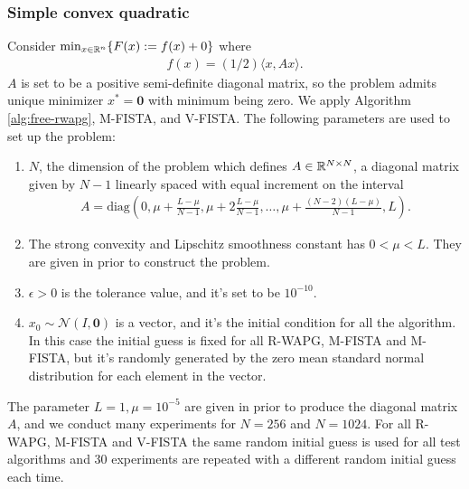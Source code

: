 \documentclass[12pt]{article}
\begin{document}
        \subsubsection{Simple convex quadratic}
            Consider $\min_{x \in \mathbb R^n} \{F(x):= f(x) + 0\}$ where 
            \begin{align*}
                f(x) = (1/2)\langle x, A x\rangle. 
            \end{align*}
            $A$ is set to be a positive semi-definite diagonal matrix, so the problem admits unique minimizer $x^* = \mathbf 0$ with minimum being zero. 
            We apply Algorithm \ref{alg:free-rwapg}, M-FISTA, and V-FISTA. 
            The following parameters are used to set up the problem: 
            \begin{enumerate}
                \item $N$, the dimension of the problem which defines $A \in \mathbb R^{N\times N}$, a diagonal matrix given by $N- 1$ linearly spaced with equal increment on the interval 
                \begin{align*}
                    A = \text{diag}
                    \left(0, 
                        \mu + \frac{L - \mu}{N - 1},
                        \mu + 2\frac{L - \mu}{N - 1}, 
                        \ldots, 
                        \mu + \frac{(N - 2)(L - \mu)}{N - 1}, 
                        L
                    \right). 
                \end{align*}
                \item The strong convexity and Lipschitz smoothness constant has $0 < \mu < L$. They are given in prior to construct the problem. 
                \item $\epsilon > 0$ is the tolerance value, and it's set to be $10^{-10}$. 
                \item $x_0 \sim \mathcal N(I, \mathbf 0)$ is a vector, and it's the initial condition for all the algorithm. In this case the initial guess is fixed for all R-WAPG, M-FISTA and M-FISTA, but it's randomly generated by the zero mean standard normal distribution for each element in the vector. 
            \end{enumerate}
            The parameter $L=1, \mu=10^{-5}$ are given in prior to produce the diagonal matrix $A$, and we conduct many experiments for $N = 256$ and $N = 1024$. 
            For all R-WAPG, M-FISTA and V-FISTA the same random initial guess is used for all test algorithms and 30 experiments are repeated with a different random initial guess each time. 
\end{document}
